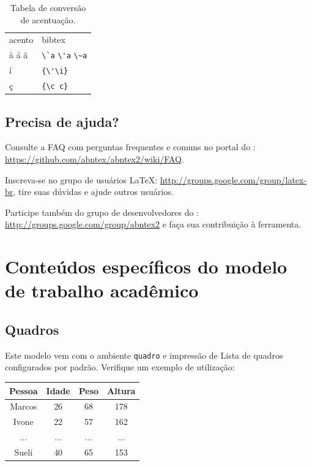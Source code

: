 \documentclass[
	12pt,				%
	openright,			%
	oneside,			    %
	a4paper,				%
	english,			%
	french,			%
	spanish,			%
	brazil			%
	]{abntex2}
\begin{document}
\begin{table}[htbp]
\caption{Tabela de conversão de acentuação.}
\label{tabela-acentos}

\begin{center}
\begin{tabular}{ll}\hline\hline
acento & \textsf{bibtex}\\
à á ã & \verb+\`a+ \verb+\'a+ \verb+\~a+\\
í & \verb+{\'\i}+\\
ç & \verb+{\c c}+\\
\hline\hline
\end{tabular}
\end{center}
\end{table}


\section{Precisa de ajuda?}

Consulte a FAQ com perguntas frequentes e comuns no portal do \abnTeX:
\url{https://github.com/abntex/abntex2/wiki/FAQ}.

Inscreva-se no grupo de usuários \LaTeX:
\url{http://groups.google.com/group/latex-br}, tire suas dúvidas e ajude
outros usuários.

Participe também do grupo de desenvolvedores do \abnTeX:
\url{http://groups.google.com/group/abntex2} e faça sua contribuição à
ferramenta.

\chapter{Conteúdos específicos do modelo de trabalho acadêmico}\label{cap_trabalho_academico}

\section{Quadros}

Este modelo vem com o ambiente \texttt{quadro} e impressão de Lista de quadros 
configurados por padrão. Verifique um exemplo de utilização:

\begin{quadro}[htb]
\caption{\label{quadro_exemplo}Exemplo de quadro}
\begin{tabular}{|c|c|c|c|}
	\hline
	\textbf{Pessoa} & \textbf{Idade} & \textbf{Peso} & \textbf{Altura} \\ \hline
	Marcos & 26    & 68   & 178    \\ \hline
	Ivone  & 22    & 57   & 162    \\ \hline
	...    & ...   & ...  & ...    \\ \hline
	Sueli  & 40    & 65   & 153    \\ \hline
\end{tabular}
\end{quadro}
\end{document}
